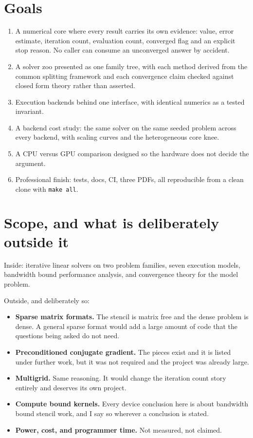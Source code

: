 \documentclass[11pt,a4paper]{report}
\begin{document}
\section{Goals}

\begin{enumerate}[leftmargin=*]
  \item A numerical core where every result carries its own evidence: value,
        error estimate, iteration count, evaluation count, converged flag and an
        explicit stop reason. No caller can consume an unconverged answer by
        accident.
  \item A solver zoo presented as one family tree, with each method derived from
        the common splitting framework and each convergence claim checked against
        closed form theory rather than asserted.
  \item Execution backends behind one interface, with identical numerics as a
        tested invariant.
  \item A backend cost study: the same solver on the same seeded problem across
        every backend, with scaling curves and the heterogeneous core knee.
  \item A CPU versus GPU comparison designed so the hardware does not decide the
        argument.
  \item Professional finish: tests, docs, CI, three PDFs, all reproducible from a
        clean clone with \texttt{make all}.
\end{enumerate}

\section{Scope, and what is deliberately outside it}

Inside: iterative linear solvers on two problem families, seven execution
models, bandwidth bound performance analysis, and convergence theory for the
model problem.

Outside, and deliberately so:

\begin{itemize}[leftmargin=*]
  \item \textbf{Sparse matrix formats.} The stencil is matrix free and the dense
        problem is dense. A general sparse format would add a large amount of
        code that the questions being asked do not need.
  \item \textbf{Preconditioned conjugate gradient.} The pieces exist and it is
        listed under further work, but it was not required and the project was
        already large.
  \item \textbf{Multigrid.} Same reasoning. It would change the iteration count
        story entirely and deserves its own project.
  \item \textbf{Compute bound kernels.} Every device conclusion here is about
        bandwidth bound stencil work, and I say so wherever a conclusion is
        stated.
  \item \textbf{Power, cost, and programmer time.} Not measured, not claimed.
\end{itemize}
\end{document}
